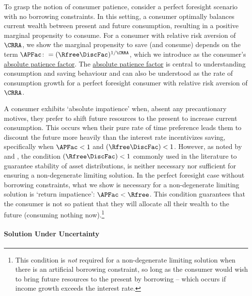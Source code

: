 \documentclass[BufferStockTheory]{subfiles}
\begin{document}
To grasp the notion of consumer patience, consider a perfect foresight scenario with no borrowing constraints.
In this setting, a consumer optimally balances current wealth between present and future consumption, resulting in a positive marginal propensity to consume.
For a consumer with relative risk aversion of $\CRRA$, we show the marginal propensity to save (and consume) depends on the term $\APFac\colon =(\Rfree \DiscFac)^{1/\CRRA}$, which we introduce as the consumer's \hyperlink{APFAC}{absolute patience factor}.
The \hyperlink{APFAC}{absolute patience factor} is central to understanding consumption and saving behaviour and can also be understood as the rate of consumption growth for a perfect foresight consumer with relative risk aversion of $\CRRA$.


A consumer exhibits `absolute impatience' when, absent any precautionary motives, they prefer to shift future resources to the present to increase current consumption.
This occurs when their pure rate of time preference leads them to discount the future more heavily than the interest rate incentivizes saving, specifically when $\APFac < 1$ and $(\Rfree \DiscFac) < 1$.
However, as noted by \cite{szeidlInvariant} and \cite{maUnboundedDP}, the condition $(\Rfree \DiscFac) < 1$ commonly used in the literature to guarantee stability of asset distributions, is neither necessary nor sufficient for ensuring a non-degenerate limiting solution.
In the perfect foresight case without borrowing constraints, what we show is necessary for a non-degenerate limiting solution is `return impatience': $\APFac < \Rfree$.
This condition guarantees that the consumer is not so patient that they will allocate all their wealth to the future (consuming nothing now).\footnote{This condition is \textit{not} required for a non-degenerate limiting solution when there is an artificial borrowing constraint, so long as the consumer would wish to bring future resources to the present by borrowing -- which occurs if income growth exceeds the interest rate.}


\paragraph{Solution Under Uncertainty}
\end{document}

